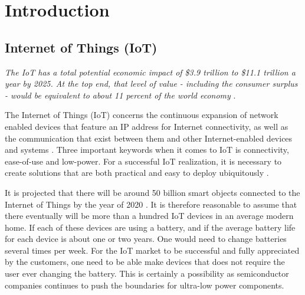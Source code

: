 \setcounter{page}{1}

\chapter{Introduction}
\section{Internet of Things (IoT)}

\textit{The IoT has a total potential economic impact of \$3.9 trillion to \$11.1 trillion a year by 2025. At the top end, that level of value - including the consumer surplus - would be equivalent to about 11 percent of the world economy} \cite{mckinsey15}.





The Internet of Things (IoT) concerns the continuous expansion of network enabled devices that feature an IP address for Internet connectivity, as well as the communication that exist between them and other Internet-enabled devices and systems \cite{webopedia}. Three important keywords when it comes to IoT is connectivity, ease-of-use and low-power. For a successful IoT realization, it is necessary to create solutions that are both practical and easy to deploy ubiquitously \cite{embedded_IoT}. %


It is projected that there will be around 50 billion smart objects connected to the Internet of Things by the year of 2020 \cite{jayakumar14}. It is therefore reasonable to assume that there eventually will be more than a hundred IoT devices in an average modern home. If each of these devices are using a battery, and if the average battery life for each device is about one or two years. One would need to change batteries several times per week. For the IoT market to be successful and fully appreciated by the customers, one need to be able make devices that does not require the user ever changing the battery. This is certainly a possibility as semiconductor companies continues to push the boundaries for ultra-low power components.  

